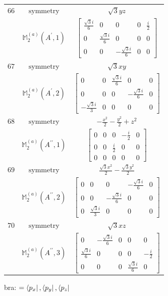 \documentclass[fleqn,8pt,landscape]{jsarticle}
\begin{document}
\begin{longtable}{ccc}
$ 66 $ & $ \text{symmetry} $ & $ \sqrt{3} y z $ \\
$  $ & $ \mathbb{M}_{2}^{(a)}(A^{\prime},1) $ & $ \begin{bmatrix} \frac{\sqrt{3} i}{6} & 0 & 0 & 0 & \frac{i}{2} \\ 0 & \frac{\sqrt{3} i}{6} & 0 & 0 & 0 \\ 0 & 0 & - \frac{\sqrt{3} i}{6} & 0 & 0 \end{bmatrix} $ \\ \hline
$ 67 $ & $ \text{symmetry} $ & $ \sqrt{3} x y $ \\
$  $ & $ \mathbb{M}_{2}^{(a)}(A^{\prime},2) $ & $ \begin{bmatrix} 0 & 0 & \frac{\sqrt{3} i}{6} & 0 & 0 \\ 0 & 0 & 0 & - \frac{\sqrt{3} i}{6} & 0 \\ - \frac{\sqrt{3} i}{3} & 0 & 0 & 0 & 0 \end{bmatrix} $ \\ \hline
$ 68 $ & $ \text{symmetry} $ & $ - \frac{x^{2}}{2} - \frac{y^{2}}{2} + z^{2} $ \\
$  $ & $ \mathbb{M}_{2}^{(a)}(A^{\prime\prime},1) $ & $ \begin{bmatrix} 0 & 0 & 0 & - \frac{i}{2} & 0 \\ 0 & 0 & \frac{i}{2} & 0 & 0 \\ 0 & 0 & 0 & 0 & 0 \end{bmatrix} $ \\ \hline
$ 69 $ & $ \text{symmetry} $ & $ \frac{\sqrt{3} x^{2}}{2} - \frac{\sqrt{3} y^{2}}{2} $ \\
$  $ & $ \mathbb{M}_{2}^{(a)}(A^{\prime\prime},2) $ & $ \begin{bmatrix} 0 & 0 & 0 & - \frac{\sqrt{3} i}{6} & 0 \\ 0 & 0 & - \frac{\sqrt{3} i}{6} & 0 & 0 \\ 0 & \frac{\sqrt{3} i}{3} & 0 & 0 & 0 \end{bmatrix} $ \\ \hline
$ 70 $ & $ \text{symmetry} $ & $ \sqrt{3} x z $ \\
$  $ & $ \mathbb{M}_{2}^{(a)}(A^{\prime\prime},3) $ & $ \begin{bmatrix} 0 & - \frac{\sqrt{3} i}{6} & 0 & 0 & 0 \\ \frac{\sqrt{3} i}{6} & 0 & 0 & 0 & - \frac{i}{2} \\ 0 & 0 & 0 & \frac{\sqrt{3} i}{6} & 0 \end{bmatrix} $ \\ \hline
\end{longtable}
bra: $=\bra{p_{x}}, \bra{p_{y}}, \bra{p_{z}}$
\end{document}

